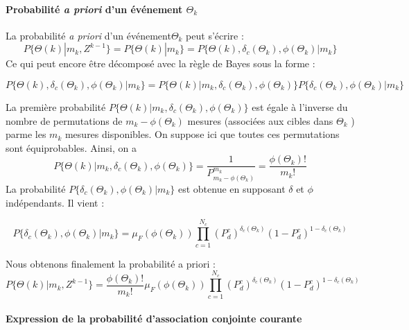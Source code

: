 \documentclass[10pt,french,a4paper]{report}
\begin{document}
 	\paragraph{Probabilité \textit{a priori} d'un événement $\Theta_k$}
 	
 	La probabilité \textit{a priori} d'un événement$\Theta_k$ peut s'écrire : 
 	 	 \begin{equation}
P\{\Theta(k) |m_k, Z^{k-1} \}= P\{\Theta(k) | m_k\} = P\{\Theta(k), \delta_c(\Theta_k) , \phi(\Theta_k)  | m_k\}
 	  \end{equation} 
 	Ce qui peut encore être décomposé avec la règle de Bayes sous la forme  :
 	
 	 	 	 \begin{equation}
 P\{\Theta(k), \delta_c(\Theta_k) , \phi(\Theta_k)  | m_k\} =  P\{\Theta(k) | m_k , \delta_c(\Theta_k) , \phi(\Theta_k)  \} P\{ \delta_c(\Theta_k) , \phi(\Theta_k)  | m_k\}
 	  \end{equation} 
 	
 	La première probabilité $P\{\Theta(k) | m_k , \delta_c(\Theta_k) , \phi(\Theta_k)  \} $ est égale à l'inverse du nombre de permutations de $m_k -  \phi(\Theta_k)$ mesures (associées aux cibles dans $\Theta_k$ ) parme les $m_k$ mesures disponibles. On suppose ici que toutes ces permutations sont équiprobables. Ainsi, on a
    	 	 	 \begin{equation}
  P\{\Theta(k) | m_k , \delta_c(\Theta_k) , \phi(\Theta_k)  \} = \frac{1}{P^{m_k}_{m_k- \phi(\Theta_k) } } = \frac{ \phi(\Theta_k)! }{m_k!}
 	  \end{equation} 
 	  La probabilité $P\{ \delta_c(\Theta_k) , \phi(\Theta_k)  | m_k\}$ est obtenue en supposant $\delta$ et $\phi$ indépendants. Il vient :
 	  
 	     	 	 	 \begin{equation}
 P\{ \delta_c(\Theta_k) , \phi(\Theta_k)  | m_k\} = \mu_F(\phi(\Theta_k)) \prod _{c=1}^{N_c} (P_d^c)^{\delta_c(\Theta_k)}(1-P_d^c)^{1 - \delta_c(\Theta_k)}
 	  \end{equation}  
 	  
 	  Nous obtenons finalement la probabilité a priori :
 	   	     	 	 	 \begin{equation}
 \label{eq:JPDAFProbaApriori}
 P\{\Theta(k) |m_k, Z^{k-1} \}= \frac{ \phi(\Theta_k)! }{m_k!}\mu_F(\phi(\Theta_k)) \prod _{c=1}^{N_c} (P_d^c)^{\delta_c(\Theta_k)}(1-P_d^c)^{1 - \delta_c(\Theta_k)}
 	  \end{equation}  
 	  
 	  
 	  \paragraph{Expression de la probabilité d'association conjointe courante} 
 	  
\end{document}
